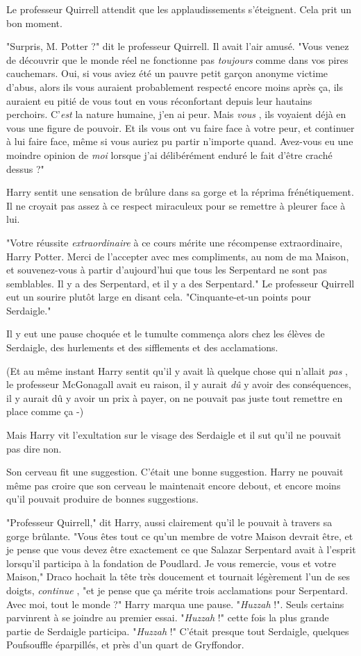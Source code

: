 Le professeur Quirrell attendit que les applaudissements s'éteignent. Cela prit un bon moment.

"Surpris, M. Potter ?" dit le professeur Quirrell. Il avait l'air amusé. "Vous venez de découvrir que le monde réel ne fonctionne pas \emph{toujours}  comme dans vos pires cauchemars. Oui, si vous aviez été un pauvre petit garçon anonyme victime d'abus, alors ils vous auraient probablement respecté encore moins après ça, ils auraient eu pitié de vous tout en vous réconfortant depuis leur hautains perchoirs. C'\emph{est}  la nature humaine, j'en ai peur. Mais \emph{vous} , ils voyaient déjà en vous une figure de pouvoir. Et ils vous ont vu faire face à votre peur, et continuer à lui faire face, même si vous auriez pu partir n'importe quand. Avez-vous eu une moindre opinion de \emph{moi}  lorsque j'ai délibérément enduré le fait d'être craché dessus ?"

Harry sentit une sensation de brûlure dans sa gorge et la réprima frénétiquement. Il ne croyait pas assez à ce respect miraculeux pour se remettre à pleurer face à lui.

"Votre réussite \emph{extraordinaire}  à ce cours mérite une récompense extraordinaire, Harry Potter. Merci de l'accepter avec mes compliments, au nom de ma Maison, et souvenez-vous à partir d'aujourd'hui que tous les Serpentard ne sont pas semblables. Il y a des Serpentard, et il y a des Serpentard." Le professeur Quirrell eut un sourire plutôt large en disant cela. "Cinquante-et-un points pour Serdaigle."

Il y eut une pause choquée et le tumulte commença alors chez les élèves de Serdaigle, des hurlements et des sifflements et des acclamations.

(Et au même instant Harry sentit qu'il y avait là quelque chose qui n'allait \emph{pas} , le professeur McGonagall avait eu raison, il y aurait \emph{dû}  y avoir des conséquences, il y aurait dû y avoir un prix à payer, on ne pouvait pas juste tout remettre en place comme ça -)

Mais Harry vit l'exultation sur le visage des Serdaigle et il sut qu'il ne pouvait pas dire non.

Son cerveau fit une suggestion. C'était une bonne suggestion. Harry ne pouvait même pas croire que son cerveau le maintenait encore debout, et encore moins qu'il pouvait produire de bonnes suggestions.

"Professeur Quirrell," dit Harry, aussi clairement qu'il le pouvait à travers sa gorge brûlante. "Vous êtes tout ce qu'un membre de votre Maison devrait être, et je pense que vous devez être exactement ce que Salazar Serpentard avait à l'esprit lorsqu'il participa à la fondation de Poudlard. Je vous remercie, vous et votre Maison," Draco hochait la tête très doucement et tournait légèrement l'un de ses doigts, \emph{continue} , "et je pense que ça mérite trois acclamations pour Serpentard. Avec moi, tout le monde ?" Harry marqua une pause. "\emph{Huzzah}  !". Seuls certains parvinrent à se joindre au premier essai. "\emph{Huzzah}  !" cette fois la plus grande partie de Serdaigle participa. "\emph{Huzzah}  !" C'était presque tout Serdaigle, quelques Poufsouffle éparpillés, et près d'un quart de Gryffondor.

